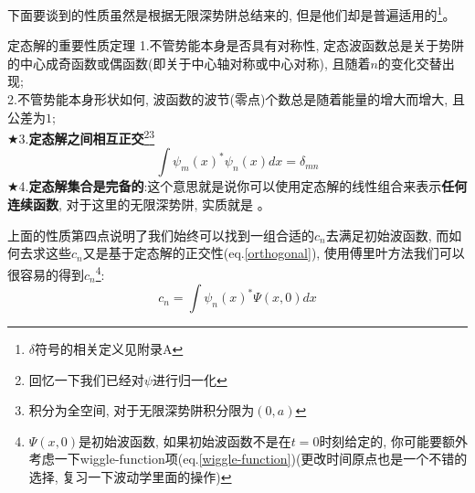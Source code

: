 \documentclass[a4paper,zihao=-4,linespread=1]{ctexrep}
\newenvironment{lequation}{\large\begin{equation}}{\end{equation}}
\begin{document}
    下面要谈到的性质虽然是根据无限深势阱总结来的, 但是他们却是普遍适用的\footnote[3]{$\delta$符号的相关定义见附录A}。
    \begin{theorem}{定态解的重要性质定理}
        1.不管势能本身是否具有对称性, 定态波函数总是关于势阱的中心成奇函数或偶函数(即关于中心轴对称或中心对称), 且随着$n$的变化交替出现;\\
        2.不管势能本身形状如何, 波函数的波节(零点)个数总是随着能量的增大而增大, 且公差为$1$;\\
        $\bigstar$3.\textbf{定态解之间相互正交}\footnote{回忆一下我们已经对$\psi$进行归一化}\footnote{积分为全空间, 对于无限深势阱积分限为$(0,a)$}
        \begin{lequation}
            \label{orthogonal}
            \int \psi_m(x)^*\psi_n(x) dx=\delta_{mn}
        \end{lequation} 
        $\bigstar$4.\textbf{定态解集合是完备的}:这个意思就是说你可以使用定态解的线性组合来表示\textbf{任何连续函数}, 对于这里的无限深势阱, 实质就是
        。
    \end{theorem}
    上面的性质第四点说明了我们始终可以找到一组合适的$c_n$去满足初始波函数, 而如何去求这些$c_n$又是基于定态解的正交性(eq.\ref{orthogonal}), 使用傅里叶方法我们可以
    很容易的得到$c_n$\footnote[1]{$\Psi(x,0)$是初始波函数, 如果初始波函数不是在$t=0$时刻给定的, 你可能要额外考虑一下wiggle-function项(eq.\ref{wiggle-function})(更改时间原点也是一个不错的选择, 复习一下波动学里面的操作)}:
    \begin{lequation}
        \boxed{
            c_n=\int \psi_n(x)^*\Psi(x,0) dx
        }
    \end{lequation}
\end{document}
